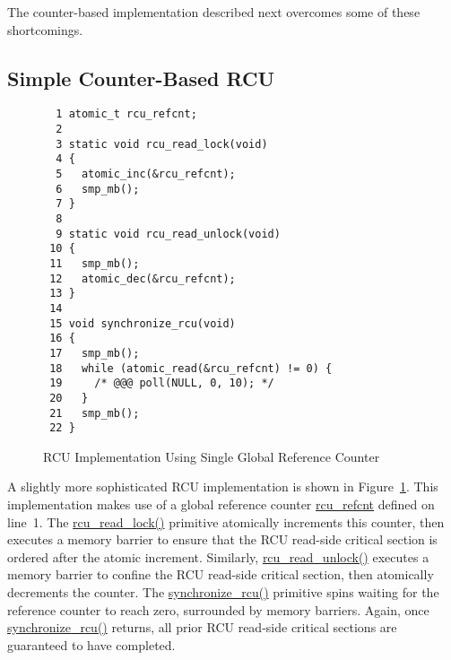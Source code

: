  \QuickQuizEnd

The counter-based implementation described next overcomes some of
these shortcomings.

\subsection{Simple Counter-Based RCU}
\label{app:rcuimpl:Simple Counter-Based RCU}

\begin{figure}[bp]
{ \scriptsize
\begin{verbatim}
  1 atomic_t rcu_refcnt;
  2 
  3 static void rcu_read_lock(void)
  4 {
  5   atomic_inc(&rcu_refcnt);
  6   smp_mb();
  7 }
  8 
  9 static void rcu_read_unlock(void)
 10 {
 11   smp_mb();
 12   atomic_dec(&rcu_refcnt);
 13 }
 14 
 15 void synchronize_rcu(void)
 16 {
 17   smp_mb();
 18   while (atomic_read(&rcu_refcnt) != 0) {
 19     /* @@@ poll(NULL, 0, 10); */
 20   }
 21   smp_mb();
 22 }
\end{verbatim}
}
\caption{RCU Implementation Using Single Global Reference Counter}
\label{fig:app:rcuimpl:RCU Implementation Using Single Global Reference Counter}
\end{figure}

A slightly more sophisticated RCU implementation is shown in
Figure~\ref{fig:app:rcuimpl:RCU Implementation Using Single Global Reference Counter}.
This implementation makes use of a global reference counter
\url{rcu_refcnt} defined on line~1.
The \url{rcu_read_lock()} primitive atomically increments this
counter, then executes a memory barrier to ensure that the
RCU read-side critical section is ordered after the atomic
increment.
Similarly, \url{rcu_read_unlock()} executes a memory barrier to
confine the RCU read-side critical section, then atomically
decrements the counter.
The \url{synchronize_rcu()} primitive spins waiting for the reference
counter to reach zero, surrounded by memory barriers.
Again, once \url{synchronize_rcu()} returns, all prior
RCU read-side critical sections are guaranteed to have completed.


